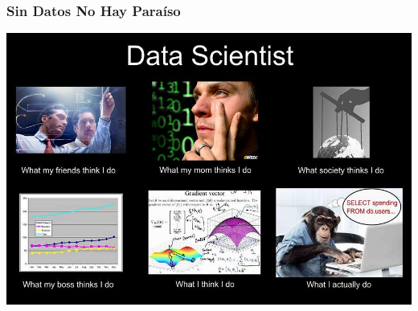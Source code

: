 \documentclass[leqno, 10pt, envcountsect]{beamer}
\numberwithin{equation}{section}
\theoremstyle{definition}
\theoremstyle{example}
\numberwithin{figure}{section}
\numberwithin{table}{section}
\begin{document}
\begin{frame}[fragile=singleslide]
  \frametitle{Sin Datos No Hay Paraíso}
  \begin{center}
    \includegraphics[scale=0.35]{whatido.jpg}
  \end{center}
\end{frame}
\end{document}
